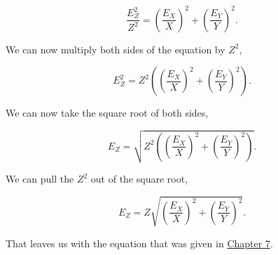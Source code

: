 \documentclass[
]{scrbook}
\begin{document}
\[\frac{E_Z^2}{Z^2} = \left(\frac{E_X}{X}\right)^2 +\left(\frac{E_Y}{Y}\right)^2.\]

We can now multiply both sides of the equation by \(Z^2\),

\[E_Z^2 = Z^2 \left(\left(\frac{E_X}{X}\right)^2 +\left(\frac{E_Y}{Y}\right)^2 \right).\]

We can now take the square root of both sides,

\[E_Z = \sqrt{ Z^2 \left( \left( \frac{E_X}{X}\right)^2 + \left(\frac{E_Y}{Y}\right)^2 \right) }.\]

We can pull the \(Z^2\) out of the square root,

\[E_Z = Z \sqrt{\left( \frac{E_X}{X}\right)^2 + \left(\frac{E_Y}{Y}\right)^2}.\]

That leaves us with the equation that was given in \protect\hyperlink{Chapter_7}{Chapter 7}.

  
\end{document}
